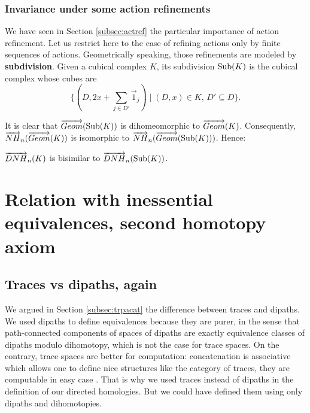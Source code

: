	\subsubsection{Invariance under some action refinements}
	
	We have seen in Section \ref{subsec:actref} the particular importance of action refinement. Let us restrict here to the case of refining actions only by finite sequences of actions. Geometrically speaking, those refinements are modeled by \textbf{subdivision}. Given a cubical complex $K$, its subdivision $\text{Sub}(K)$ is the cubical complex whose cubes are $$\{(D,2x + \sum\limits_{j \in D'} \vec{1}_j) \mid (D,x) \in K, \, D' \subseteq D\}.$$
	
	It is clear that $\overrightarrow{Geom}(\text{Sub}(K))$ is dihomeomorphic to $\overrightarrow{Geom}(K)$. Consequently, $\overrightarrow{NH}_{n}(\overrightarrow{Geom}(K))$ is isomorphic to $\overrightarrow{NH}_{n}(\overrightarrow{Geom}(\text{Sub}(K)))$. Hence:
	
	\begin{coro}
	$\overrightarrow{DNH}_{n}(K)$ is bisimilar to $\overrightarrow{DNH}_{n}(\text{Sub}(K))$.
	\end{coro}




\section{Relation with inessential equivalences, second homotopy axiom}
\label{sec:sechomax}

\subsection{Traces vs dipaths, again}

We argued in Section \ref{subsec:trpacat} the difference between traces and dipaths. We used dipaths to define equivalences because they are purer, in the sense that path-connected components of spaces of dipaths are exactly equivalence classes of dipaths modulo dihomotopy, which is not the case for trace spaces. On the contrary, trace spaces are better for computation: concatenation is associative which allows one to define nice structures like the category of traces, they are computable in easy case \cite{raussen10}. That is why we used traces instead of dipaths in the definition of our directed homologies. But we could have defined them using only dipaths and dihomotopies.

